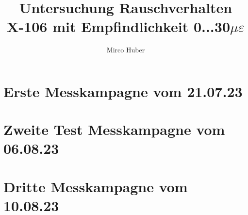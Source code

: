\documentclass[12pt,a4paper]{report}
\title{Untersuchung Rauschverhalten\\[3ex] \small{ X-106 mit Empfindlichkeit 0...30$\mu\varepsilon$}}
\author{Mirco Huber}
\begin{document}
	\maketitle
	\newpage
	
	\begingroup
	
	
	\thispagestyle{empty}

	\tableofcontents
	
	\thispagestyle{empty} %
	
	\endgroup
\clearpage \newpage
	\thispagestyle{empty}
	\listoffigures
	\thispagestyle{empty}
	\listoftables
	\thispagestyle{empty}
\clearpage \newpage
	

	
	
	\chapter{Erste Messkampagne vom 21.07.23}
	\setcounter{page}{1}
	
	\newpage
	\chapter{Zweite Test Messkampagne vom 06.08.23}
	
	\newpage
	\chapter{Dritte Messkampagne vom 10.08.23}
	
\end{document}
